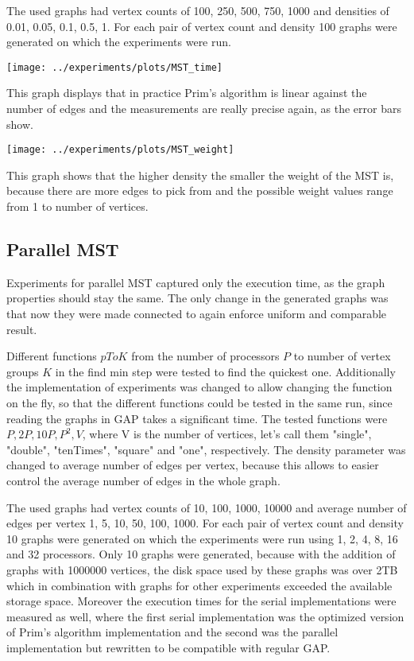 \documentclass{report}
\theoremstyle{plain}
\theoremstyle{definition}
\theoremstyle{remark}
\begin{document}
The used graphs had vertex counts of 100, 250, 500, 750, 1000 and densities of 0.01, 0.05, 0.1, 0.5, 1. For each pair of vertex count and density 100 graphs were generated on which the experiments were run.

\texttt{[image: ../experiments/plots/MST\_time]}

This graph displays that in practice Prim's algorithm is linear against the number of edges and the measurements are really precise again, as the error bars show.

\texttt{[image: ../experiments/plots/MST\_weight]}

This graph shows that the higher density the smaller the weight of the MST is, because there are more edges to pick from and the possible weight values range from 1 to number of vertices.

\subsection{Parallel MST}

Experiments for parallel MST captured only the execution time, as the graph properties should stay the same. The only change in the generated graphs was that now they were made connected to again enforce uniform and comparable result.

Different functions $pToK$ from the number of processors $P$ to number of vertex groups $K$ in the find min step were tested to find the quickest one. Additionally the implementation of experiments was changed to allow changing the function on the fly, so that the different functions could be tested in the same run, since reading the graphs in GAP takes a significant time. The tested functions were $P, 2P, 10P, P^2, V$, where V is the number of vertices, let's call them "single", "double", "tenTimes", "square" and "one", respectively. The density parameter was changed to average number of edges per vertex, because this allows to easier control the average number of edges in the whole graph.

The used graphs had vertex counts of 10, 100, 1000, 10000 and average number of edges per vertex 1, 5, 10, 50, 100, 1000. For each pair of vertex count and density 10 graphs were generated on which the experiments were run using 1, 2, 4, 8, 16 and 32 processors. Only 10 graphs were generated, because with the addition of graphs with 1000000 vertices, the disk space used by these graphs was over 2TB which in combination with graphs for other experiments exceeded the available storage space.
Moreover the execution times for the serial implementations were measured as well, where the first serial implementation was the optimized version of Prim's algorithm implementation and the second was the parallel implementation but rewritten to be compatible with regular GAP.
\end{document}

